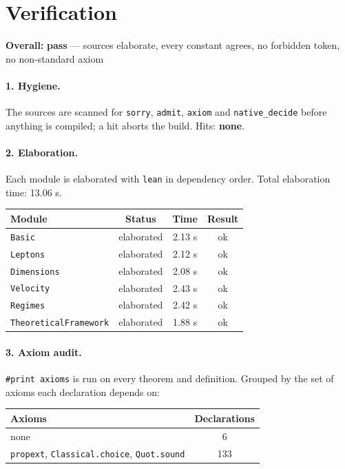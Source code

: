 \documentclass[11pt,a4paper]{article}
\begin{document}
\section{Verification}
\label{sec:verification}

\noindent\textbf{Overall:} \textcolor{okgreen}{\textbf{pass} --- sources elaborate, every constant agrees, no forbidden token, no non-standard axiom}

\paragraph{1. Hygiene.}
The sources are scanned for \texttt{sorry}, \texttt{admit}, \texttt{axiom}
and \texttt{native\_decide} before anything is compiled; a hit aborts the
build.  Hits: \textbf{none}.

\paragraph{2. Elaboration.}
Each module is elaborated with \texttt{lean} in dependency order.
Total elaboration time: 13.06 s.

\begin{center}\small
\begin{tabular}{@{}lccc@{}}
\toprule
Module & Status & Time & Result \\
\midrule
\texttt{Basic} & elaborated & 2.13 s & ok \\
\texttt{Leptons} & elaborated & 2.12 s & ok \\
\texttt{Dimensions} & elaborated & 2.08 s & ok \\
\texttt{Velocity} & elaborated & 2.43 s & ok \\
\texttt{Regimes} & elaborated & 2.42 s & ok \\
\texttt{TheoreticalFramework} & elaborated & 1.88 s & ok \\
\bottomrule
\end{tabular}
\end{center}

\paragraph{3. Axiom audit.}
\texttt{\#print axioms} is run on every theorem and definition.  Grouped by
the set of axioms each declaration depends on:

\begin{center}\small
\begin{tabular}{@{}lc@{}}
\toprule
Axioms & Declarations \\
\midrule
none & 6 \\
\texttt{propext}, \texttt{Classical.choice}, \texttt{Quot.sound} & 133 \\
\bottomrule
\end{tabular}
\end{center}
\end{document}

